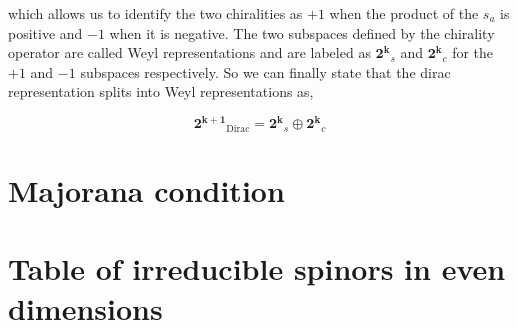 which allows us to identify the two chiralities as $+1$ when the product of the $s_a$ is positive and $-1$ when it is negative. The two subspaces defined by the chirality operator are called Weyl representations and are labeled as $\mathbf{2^k}_s$ and $\mathbf{2^k}_c$ for the $+1$ and $-1$ subspaces respectively. So we can finally state that the dirac representation splits into Weyl representations as,

\begin{equation}
    \mathbf{2^{k+1}}_\text{Dirac} = \mathbf{2^k}_s \oplus \mathbf{2^k}_c
\end{equation}

\section{Majorana condition}

\section{Table of irreducible spinors in even dimensions}
